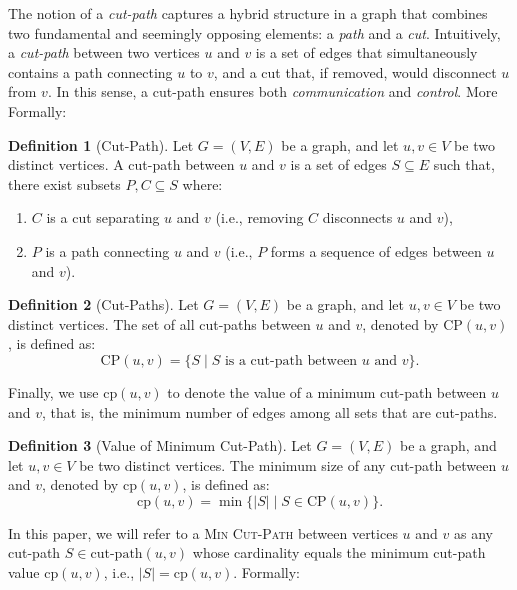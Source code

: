 \documentclass[journal ]{new-aiaa}
\numberwithin{equation}{section}
\theoremstyle{definition}
\newtheorem{definition}{Definition}[section]
\theoremstyle{plain}
\theoremstyle{remark}
\begin{document}
The notion of a \emph{cut-path} captures a hybrid structure in a graph that combines two fundamental and seemingly opposing elements: a \textit{path} and a \textit{cut}. Intuitively, a \textit{cut-path} between two vertices \(u\) and \(v\) is a set of edges that simultaneously contains a path connecting \(u\) to \(v\), and a cut that, if removed, would disconnect \(u\) from \(v\). In this sense, a cut-path ensures both \textit{communication} and \textit{control}. More Formally:

\begin{definition}[Cut-Path]
Let \(G = (V, E)\) be a graph, and let \(u, v \in V\) be two distinct vertices. A cut-path between \(u\) and \(v\) is a set of edges \(S \subseteq E\) such that, there exist subsets \(P, C \subseteq S\) where:
    \begin{enumerate}
        \item \(C\) is a cut separating \(u\) and \(v\) (i.e., removing \(C\) disconnects \(u\) and \(v\)),
        \item \(P\) is a path connecting \(u\) and \(v\) (i.e., \(P\) forms a sequence of edges between \(u\) and \(v\)).
    \end{enumerate}
\end{definition}

\begin{definition}[Cut-Paths]
Let \(G = (V, E)\) be a graph, and let \(u, v \in V\) be two distinct vertices. The set of all cut-paths between \(u\) and \(v\), denoted by \(\text{CP}(u, v)\), is defined as:
\[
\text{CP}(u, v) = \{ S \mid S \text{ is a cut-path between } u \text{ and } v \}.
\]
\end{definition}

Finally, we use \(\text{cp}(u, v)\) to denote the value of a minimum cut-path between \(u\) and \(v\), 
that is, the minimum number of edges among all sets that are cut-paths.

\begin{definition}[Value of Minimum Cut-Path]
Let \(G = (V, E)\) be a graph, and let \(u, v \in V\) be two distinct vertices. The minimum size of any cut-path between \(u\) and \(v\), denoted by \(\text{cp}(u, v)\), is defined as:
\[
\text{cp}(u, v) = \min\{ |S| \mid S \in \text{CP}(u, v) \}.
\]
\end{definition}

In this paper, we will refer to a \textsc{Min Cut-Path} between vertices \(u\) and \(v\) as any cut-path \(S \in \text{cut-path}(u, v)\) whose cardinality equals the minimum cut-path value \(\text{cp}(u, v)\), i.e., \(|S| = \text{cp}(u, v)\). Formally:
\end{document}
